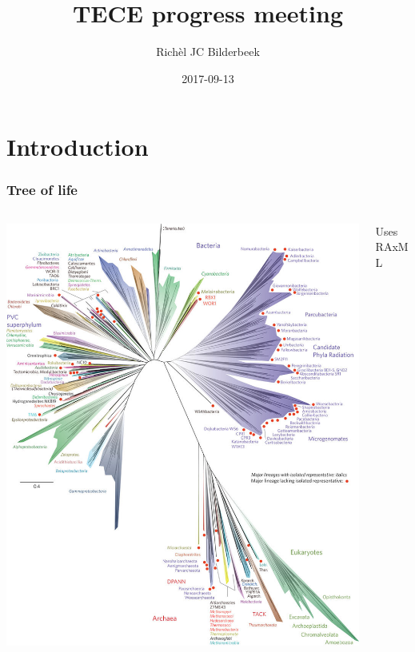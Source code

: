 \documentclass{beamer}
\title[]{TECE progress meeting}
\author[]{Rich\`{e}l JC Bilderbeek}
\institute[]{University of Groningen}
\date[]{2017-09-13}
\begin{document}
\frame{\titlepage}


\section[Section]{Introduction}

\begin{frame}
  \frametitle[]{Tree of life\footnotemark}
  \begin{columns}[T]
    \begin{column}{.5\textwidth}
      \begin{block}{}
        \includegraphics[height=0.7\textheight]{tree_of_life_2016.jpg}
      \end{block}
    \end{column}
    \begin{column}{.5\textwidth}
      \begin{block}{}
        Uses RAxML\footnotemark
      \end{block}
    \end{column}
  \end{columns}
\end{frame}
\end{document}
